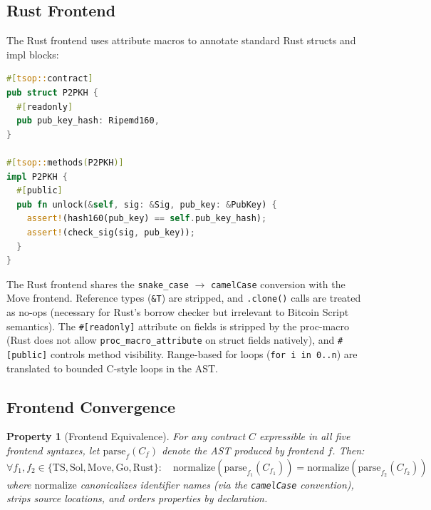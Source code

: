 \documentclass[11pt,a4paper]{article}
\newtheorem{property}[theorem]{Property}
\begin{document}
\subsection{Rust Frontend}
\label{sec:frontend-rs}

The Rust frontend uses attribute macros to annotate standard Rust structs and
impl blocks:

\begin{lstlisting}[style=tsop,language=Rust,
  morekeywords={pub,struct,impl,fn,let,mut,self}]
#[tsop::contract]
pub struct P2PKH {
  #[readonly]
  pub pub_key_hash: Ripemd160,
}

#[tsop::methods(P2PKH)]
impl P2PKH {
  #[public]
  pub fn unlock(&self, sig: &Sig, pub_key: &PubKey) {
    assert!(hash160(pub_key) == self.pub_key_hash);
    assert!(check_sig(sig, pub_key));
  }
}
\end{lstlisting}

The Rust frontend shares the \texttt{snake\_case} $\to$ \texttt{camelCase}
conversion with the Move frontend. Reference types (\texttt{\&T}) are
stripped, and \texttt{.clone()} calls are treated as no-ops (necessary for
Rust's borrow checker but irrelevant to Bitcoin Script semantics).
The \texttt{\#[readonly]} attribute on fields is stripped by the proc-macro
(Rust does not allow \texttt{proc\_macro\_attribute} on struct fields
natively), and \texttt{\#[public]} controls method visibility.
Range-based for loops (\texttt{for i in 0..n}) are translated to
bounded C-style loops in the AST.

\subsection{Frontend Convergence}
\label{sec:convergence}

\begin{property}[Frontend Equivalence]
\label{prop:frontend-equiv}
For any contract $C$ expressible in all five frontend syntaxes, let
$\text{parse}_f(C_f)$ denote the AST produced by frontend $f$. Then:
\[
  \forall f_1, f_2 \in \{\text{TS}, \text{Sol}, \text{Move}, \text{Go}, \text{Rust}\}:
  \quad \text{normalize}(\text{parse}_{f_1}(C_{f_1})) = \text{normalize}(\text{parse}_{f_2}(C_{f_2}))
\]
where $\text{normalize}$ canonicalizes identifier names (via the
\texttt{camelCase} convention), strips source locations, and orders
properties by declaration.
\end{property}
\end{document}
